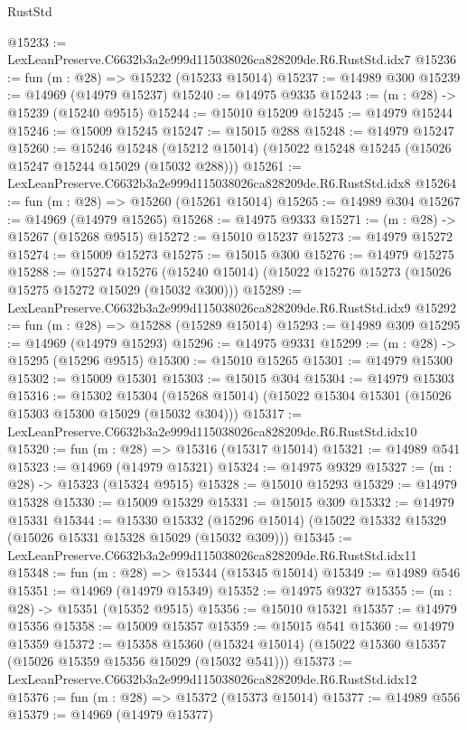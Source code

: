 \begin{lexlean}{RustStd}
\begin{coremodule}
@15233 := LexLeanPreserve.C6632b3a2e999d115038026ca828209de.R6.RustStd.idx7
@15236 := fun (m : @28) => @15232 (@15233 @15014)
@15237 := @14989 @300
@15239 := @14969 (@14979 @15237)
@15240 := @14975 @9335
@15243 := (m : @28) -> @15239 (@15240 @9515)
@15244 := @15010 @15209
@15245 := @14979 @15244
@15246 := @15009 @15245
@15247 := @15015 @288
@15248 := @14979 @15247
@15260 := @15246
    @15248
    (@15212 @15014)
    (@15022 @15248 @15245 (@15026 @15247 @15244 @15029 (@15032 @288)))
@15261 := LexLeanPreserve.C6632b3a2e999d115038026ca828209de.R6.RustStd.idx8
@15264 := fun (m : @28) => @15260 (@15261 @15014)
@15265 := @14989 @304
@15267 := @14969 (@14979 @15265)
@15268 := @14975 @9333
@15271 := (m : @28) -> @15267 (@15268 @9515)
@15272 := @15010 @15237
@15273 := @14979 @15272
@15274 := @15009 @15273
@15275 := @15015 @300
@15276 := @14979 @15275
@15288 := @15274
    @15276
    (@15240 @15014)
    (@15022 @15276 @15273 (@15026 @15275 @15272 @15029 (@15032 @300)))
@15289 := LexLeanPreserve.C6632b3a2e999d115038026ca828209de.R6.RustStd.idx9
@15292 := fun (m : @28) => @15288 (@15289 @15014)
@15293 := @14989 @309
@15295 := @14969 (@14979 @15293)
@15296 := @14975 @9331
@15299 := (m : @28) -> @15295 (@15296 @9515)
@15300 := @15010 @15265
@15301 := @14979 @15300
@15302 := @15009 @15301
@15303 := @15015 @304
@15304 := @14979 @15303
@15316 := @15302
    @15304
    (@15268 @15014)
    (@15022 @15304 @15301 (@15026 @15303 @15300 @15029 (@15032 @304)))
@15317 := LexLeanPreserve.C6632b3a2e999d115038026ca828209de.R6.RustStd.idx10
@15320 := fun (m : @28) => @15316 (@15317 @15014)
@15321 := @14989 @541
@15323 := @14969 (@14979 @15321)
@15324 := @14975 @9329
@15327 := (m : @28) -> @15323 (@15324 @9515)
@15328 := @15010 @15293
@15329 := @14979 @15328
@15330 := @15009 @15329
@15331 := @15015 @309
@15332 := @14979 @15331
@15344 := @15330
    @15332
    (@15296 @15014)
    (@15022 @15332 @15329 (@15026 @15331 @15328 @15029 (@15032 @309)))
@15345 := LexLeanPreserve.C6632b3a2e999d115038026ca828209de.R6.RustStd.idx11
@15348 := fun (m : @28) => @15344 (@15345 @15014)
@15349 := @14989 @546
@15351 := @14969 (@14979 @15349)
@15352 := @14975 @9327
@15355 := (m : @28) -> @15351 (@15352 @9515)
@15356 := @15010 @15321
@15357 := @14979 @15356
@15358 := @15009 @15357
@15359 := @15015 @541
@15360 := @14979 @15359
@15372 := @15358
    @15360
    (@15324 @15014)
    (@15022 @15360 @15357 (@15026 @15359 @15356 @15029 (@15032 @541)))
@15373 := LexLeanPreserve.C6632b3a2e999d115038026ca828209de.R6.RustStd.idx12
@15376 := fun (m : @28) => @15372 (@15373 @15014)
@15377 := @14989 @556
@15379 := @14969 (@14979 @15377)

\end{coremodule}
\end{lexlean}
